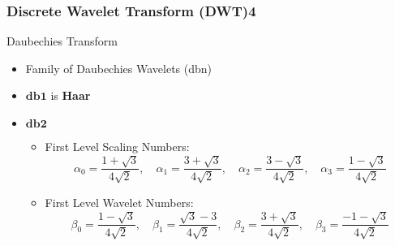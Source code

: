 \documentclass[9pt]{beamer}
\begin{document}
\begin{frame}
\frametitle{Discrete Wavelet Transform (DWT)\hfill{4}}

\begin{block}{Daubechies Transform}
    \begin{itemize}
    \item \alert{Family} of Daubechies Wavelets (dbn)
    \item $\mathbf{db1}$ is \textbf{Haar}
    \item $\mathbf{db2}$
            \begin{itemize}
            \item First Level Scaling Numbers:
            \begin{displaymath}
            \alpha_{0} = \frac{1+\sqrt{3}}{4\sqrt{2}}, \quad \alpha_{1}=\frac{3+\sqrt{3}}{4\sqrt{2}}, \quad \alpha_{2} = \frac{3-\sqrt{3}}{4\sqrt{2}}, \quad \alpha_{3}=\frac{1-\sqrt{3}}{4\sqrt{2}}
            \end{displaymath}

            \item First Level Wavelet Numbers:
            \begin{displaymath}
            \beta_{0} = \frac{1-\sqrt{3}}{4\sqrt{2}}, \quad \beta_{1}=\frac{\sqrt{3}-3}{4\sqrt{2}}, \quad \beta_{2} = \frac{3+\sqrt{3}}{4\sqrt{2}}, \quad \beta_{3}=\frac{-1-\sqrt{3}}{4\sqrt{2}}
            \end{displaymath}

	    \end{itemize}
    \end{itemize}
\end{block}
\end{frame}
\end{document}
